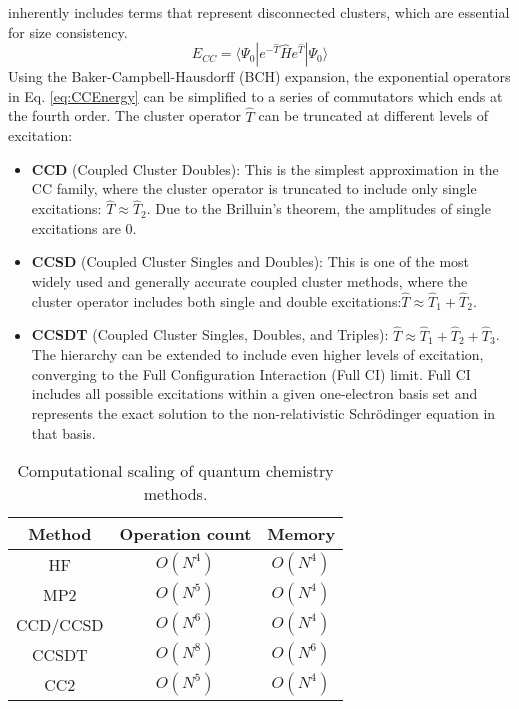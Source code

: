 inherently includes terms that represent disconnected clusters, which are essential for size consistency. \fi
\begin{equation}\label{eq:CCEnergy}
    E_{CC}=\langle \Psi_{0} | e^{-\hat{T}} \hat{H} e^{\hat{T}} | \Psi_{0} \rangle
\end{equation}
Using the Baker-Campbell-Hausdorff (BCH) expansion, the exponential operators in Eq. \ref{eq:CCEnergy} can be simplified to a series of commutators which ends at the fourth order. The cluster operator $\hat{T}$ can be truncated at different levels of excitation:
\begin{itemize}
    \item \textbf{CCD} (Coupled Cluster Doubles): This is the simplest approximation in the CC family, where the cluster operator is truncated to include only single excitations: $\hat{T} \approx \hat{T}_2$. Due to the Brilluin's theorem, the amplitudes of single excitations are 0. 
    \item \textbf{CCSD} (Coupled Cluster Singles and Doubles): This is one of the most widely used and generally accurate coupled cluster methods, where the cluster operator includes both single and double excitations:$\hat{T} \approx \hat{T}_1 + \hat{T}_2$.
    \item \textbf{CCSDT} (Coupled Cluster Singles, Doubles, and Triples): $\hat{T} \approx \hat{T}_1 + \hat{T}_2 + \hat{T}_3$.
    The hierarchy can be extended to include even higher levels of excitation, converging to the Full Configuration Interaction (Full CI) limit. Full CI includes all possible excitations within a given one-electron basis set and represents the exact solution to the non-relativistic Schrödinger equation in that basis.
\end{itemize}
\begin{table}[h!]
    \centering
    \begin{tabular}{ccc}
        Method & Operation count & Memory \\
        \hline
        HF & $O(N^4)$ & $O(N^4)$ \\
        MP2 & $O(N^5)$ & $O(N^4)$ \\
        CCD/CCSD & $O(N^6)$ & $O(N^4)$ \\
        CCSDT & $O(N^8)$ & $O(N^6)$ \\
        CC2 & $O(N^{5})$ & $O(N^4)$ \\
    \end{tabular}
    \caption{Computational scaling of quantum chemistry methods.}
    \label{tab:qc_scaling}
\end{table}

